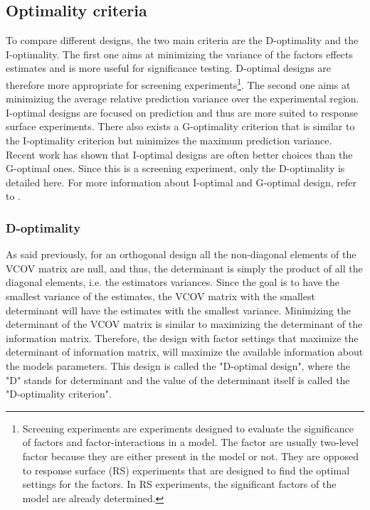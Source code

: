 \subsection{Optimality criteria}
To compare different designs, the two main criteria are the D-optimality and the I-optimality. 
The first one aims at minimizing the variance of the factors effects estimates and is more useful for significance testing. 
D-optimal designs are therefore more appropriate for screening experiments\footnote{Screening experiments are experiments designed to evaluate the significance of factors and factor-interactions in a model. The factor are usually two-level factor because they are either present in the model or not. They are opposed to response surface (RS) experiments that are designed to find the optimal settings for the factors. In RS experiments, the significant factors of the model are already determined.}. 
The second one aims at minimizing the average relative prediction variance over the experimental region. 
I-optimal designs are focused on prediction and thus are more suited to response surface experiments.
There also exists a G-optimality criterion that is similar to the I-optimality criterion but minimizes the maximum prediction 
variance. 
Recent work \parencite{rodriguez_generating_2010} has shown that I-optimal designs are often better choices than the G-optimal 
ones. 
Since this is a screening experiment, only the D-optimality is detailed here. 
For more information about I-optimal and G-optimal design, refer to \textcite{goos_optimal_2011,atkinson2014optimal}.

\subsubsection{D-optimality}
As said previously, for an orthogonal design all the non-diagonal elements of the VCOV matrix are null,
and thus, the determinant is simply the product of all the diagonal elements, i.e. the estimators variances.
Since the goal is to have the smallest variance of the estimates, the VCOV matrix with the smallest determinant will have the 
estimates with the smallest variance. 
Minimizing the determinant of the VCOV matrix is similar to maximizing the determinant of the information matrix. 
Therefore, the design with factor settings that maximize the determinant of information matrix, 
will maximize the available information about the models parameters. 
This design is called the "D-optimal design", 
where the "D" stands for determinant and the value of the determinant itself is called the "D-optimality criterion".

